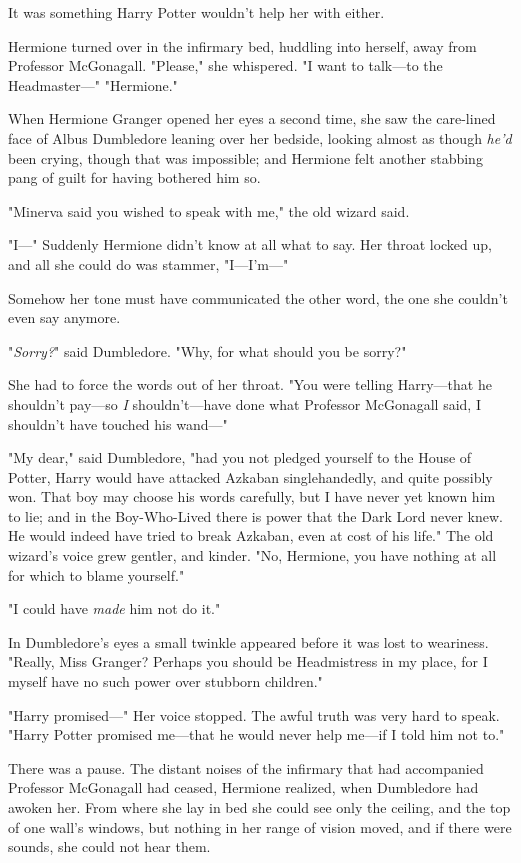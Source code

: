 It was something Harry Potter wouldn't help her with either.

Hermione turned over in the infirmary bed, huddling into herself, away from
Professor McGonagall. "Please," she whispered. "I want to talk---to the
Headmaster\mbox{---}"
\sbreak
"Hermione."

When Hermione Granger opened her eyes a second time, she saw the care-lined
face of Albus Dumbledore leaning over her bedside, looking almost as though
\emph{he'd} been crying, though that was impossible; and Hermione felt another
stabbing pang of guilt for having bothered him so.

"Minerva said you wished to speak with me," the old wizard said.

"I\mbox{---}" Suddenly Hermione didn't know at all what to say. Her throat locked up,
and all she could do was stammer, "I---I'm\mbox{---}"

Somehow her tone must have communicated the other word, the one she couldn't
even say anymore.

"\emph{Sorry?}" said Dumbledore. "Why, for what should you be sorry?"

She had to force the words out of her throat. "You were telling Harry---that he
shouldn't pay---so \emph{I} shouldn't---have done what Professor McGonagall
said, I shouldn't have touched his wand\mbox{---}"

"My dear," said Dumbledore, "had you not pledged yourself to the House of
Potter, Harry would have attacked Azkaban singlehandedly, and quite possibly
won. That boy may choose his words carefully, but I have never yet known him to
lie; and in the Boy-Who-Lived there is power that the Dark Lord never knew. He
would indeed have tried to break Azkaban, even at cost of his life." The old
wizard's voice grew gentler, and kinder. "No, Hermione, you have nothing at all
for which to blame yourself."

"I could have \emph{made} him not do it."

In Dumbledore's eyes a small twinkle appeared before it was lost to weariness.
"Really, Miss Granger? Perhaps you should be Headmistress in my place, for I
myself have no such power over stubborn children."

"Harry promised\mbox{---}" Her voice stopped. The awful truth was very hard to speak.
"Harry Potter promised me---that he would never help me---if I told him not to."

There was a pause. The distant noises of the infirmary that had accompanied
Professor McGonagall had ceased, Hermione realized, when Dumbledore had awoken
her. From where she lay in bed she could see only the ceiling, and the top of
one wall's windows, but nothing in her range of vision moved, and if there were
sounds, she could not hear them.

